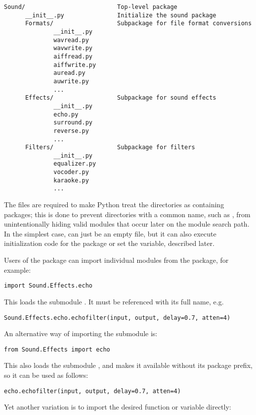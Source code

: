 \documentclass{manual}
\begin{document}
\begin{verbatim}
Sound/                          Top-level package
      __init__.py               Initialize the sound package
      Formats/                  Subpackage for file format conversions
              __init__.py
              wavread.py
              wavwrite.py
              aiffread.py
              aiffwrite.py
              auread.py
              auwrite.py
              ...
      Effects/                  Subpackage for sound effects
              __init__.py
              echo.py
              surround.py
              reverse.py
              ...
      Filters/                  Subpackage for filters
              __init__.py
              equalizer.py
              vocoder.py
              karaoke.py
              ...
\end{verbatim}
The  files are required to make Python treat the
directories as containing packages; this is done to prevent
directories with a common name, such as , from
unintentionally hiding valid modules that occur later on the module
search path. In the simplest case,  can just be an
empty file, but it can also execute initialization code for the
package or set the  variable, described later.

Users of the package can import individual modules from the
package, for example:

\begin{verbatim}
import Sound.Effects.echo
\end{verbatim}
This loads the submodule .  It must be referenced
with its full name, e.g.

\begin{verbatim}
Sound.Effects.echo.echofilter(input, output, delay=0.7, atten=4)
\end{verbatim}
An alternative way of importing the submodule is:

\begin{verbatim}
from Sound.Effects import echo
\end{verbatim}
This also loads the submodule , and makes it available without
its package prefix, so it can be used as follows:

\begin{verbatim}
echo.echofilter(input, output, delay=0.7, atten=4)
\end{verbatim}

Yet another variation is to import the desired function or variable directly:
\end{document}
